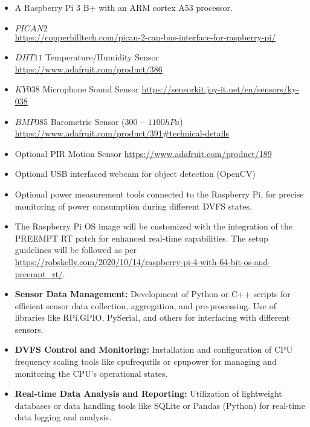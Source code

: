 \documentclass[twocolumn, 10pt]{article}
\begin{document}
\begin{itemize} 
    \item A Raspberry Pi 3 B+ with an ARM cortex 
  A53 processor.
    \item $PICAN2$\\
    \url {https://copperhilltech.com/pican-2-can-bus-interface-for-raspberry-pi/}
    \item $DHT11$ Temperature/Humidity Sensor
    \url{https://www.adafruit.com/product/386}
    \item $KY038$ Microphone Sound Sensor
    \url{https://sensorkit.joy-it.net/en/sensors/ky-038}
    \item $BMP085$ Barometric Sensor ($300-1100 hPa$)
    \url {https://www.adafruit.com/product/391#technical-details}
    \item Optional PIR Motion Sensor 
    \url {https://www.adafruit.com/product/189}
    \item Optional USB interfaced webcam for object detection (OpenCV)
    \item Optional power measurement tools connected to the Raspberry Pi, for precise monitoring of power consumption during different DVFS states.
     \item The Raspberry Pi OS image will be customized with the integration of the PREEMPT RT patch for enhanced real-time capabilities. The setup guidelines will be followed as per \url{https://robskelly.com/2020/10/14/raspberry-pi-4-with-64-bit-os-and-preempt_rt/}.
     \vspace{3mm}
    \item \textbf{Sensor Data Management:} Development of Python or C++ scripts for efficient sensor data collection, aggregation, and pre-processing. Use of libraries like RPi.GPIO, PySerial, and others for interfacing with different sensors.
    \item \textbf{DVFS Control and Monitoring:} Installation and configuration of CPU frequency scaling tools like cpufrequtils or cpupower for managing and monitoring the CPU's operational states.
    \item \textbf{Real-time Data Analysis and Reporting:} Utilization of lightweight databases or data handling tools like SQLite or Pandas (Python) for real-time data logging and analysis.
    
   
\end{itemize}
\end{document}
